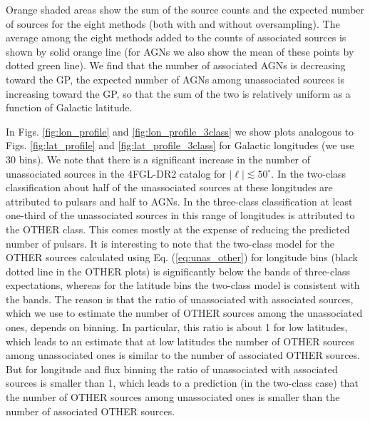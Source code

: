 \documentclass[referee]{aa} %
\begin{document}
Orange shaded areas show the sum of the source counts and the expected number of sources for the eight methods (both with and without oversampling).
The average among the eight methods added to the counts of associated sources is shown by solid orange line 
(for AGNs we also show the mean of these points by dotted green line).
We find that the number of associated AGNs is decreasing toward the GP, the expected number of AGNs among unassociated sources is increasing toward the GP, so that the sum of the two is relatively uniform as a function of Galactic latitude.


In Figs. \ref{fig:lon_profile} and \ref{fig:lon_profile_3class} we show plots analogous to Figs. \ref{fig:lat_profile} and \ref{fig:lat_profile_3class} for Galactic longitudes (we use 30 bins).
We note that there is a significant increase in the number of unassociated sources in the 4FGL-DR2  catalog for $|\ell | \lesssim 50^\circ$.
In the two-class classification about half of the unassociated sources at these longitudes are attributed to pulsars and half to AGNs.
In the three-class classification at least one-third of the unassociated sources in this range of longitudes is attributed to the OTHER class.
This comes mostly at the expense of reducing the predicted number of pulsars.
It is interesting to note that the two-class model for the OTHER sources calculated using Eq. (\ref{eq:unas_other}) for longitude bins
(black dotted line in the OTHER plots) is significantly below the bands of three-class expectations, whereas for the latitude bins the two-class model
is consistent with the bands.
The reason is that the ratio of unassociated with associated sources, which we use to estimate the number of OTHER sources among the unassociated ones, depends on binning.
In particular, this ratio is about 1 for low latitudes, which leads to an estimate that at low latitudes the number of OTHER sources among unassociated ones is similar to the number of associated OTHER sources.
But for longitude and flux binning the ratio of unassociated with associated sources is smaller than 1, which leads to a prediction (in the two-class case) that the number of OTHER sources among unassociated ones is smaller than the number of associated OTHER sources.
\end{document}

